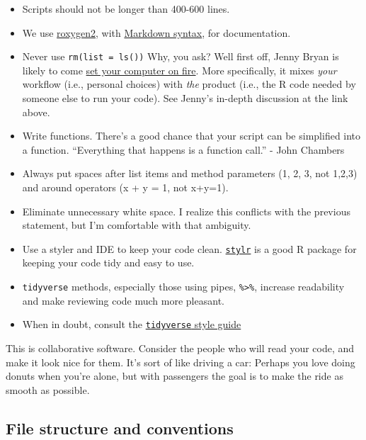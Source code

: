 \documentclass[
  letterpaper,
  DIV=11,
  numbers=noendperiod]{scrreprt}
\begin{document}
\begin{itemize}
\item
  Scripts should not be longer than 400-600 lines.
\item
  We use \href{https://cran.r-project.org/package=roxygen2}{roxygen2},
  with
  \href{https://cran.r-project.org/web/packages/roxygen2/vignettes/rd-formatting.html}{Markdown
  syntax}, for documentation.
\item
  Never use \texttt{rm(list\ =\ ls())} Why, you ask? Well first off,
  Jenny Bryan is likely to come
  \href{https://www.tidyverse.org/blog/2017/12/workflow-vs-script/}{set
  your computer on fire}. More specifically, it mixes \emph{your}
  workflow (i.e., personal choices) with \emph{the} product (i.e., the R
  code needed by someone else to run your code). See Jenny's in-depth
  discussion at the link above.
\item
  Write functions. There's a good chance that your script can be
  simplified into a function. ``Everything that happens is a function
  call.'' - John Chambers
\item
  Always put spaces after list items and method parameters (1, 2, 3, not
  1,2,3) and around operators (x + y = 1, not x+y=1).
\item
  Eliminate unnecessary white space. I realize this conflicts with the
  previous statement, but I'm comfortable with that ambiguity.
\item
  Use a styler and IDE to keep your code clean.
  \href{https://styler.r-lib.org/}{\texttt{stylr}} is a good R package
  for keeping your code tidy and easy to use.
\item
  \texttt{tidyverse} methods, especially those using pipes,
  \texttt{\%\textgreater{}\%}, increase readability and make reviewing
  code much more pleasant.
\item
  When in doubt, consult the
  \href{https://style.tidyverse.org/}{\texttt{tidyverse} style guide}
\end{itemize}

This is collaborative software. Consider the people who will read your
code, and make it look nice for them. It's sort of like driving a car:
Perhaps you love doing donuts when you're alone, but with passengers the
goal is to make the ride as smooth as possible.

\subsection{File structure and
conventions}\label{file-structure-and-conventions}
\end{document}
